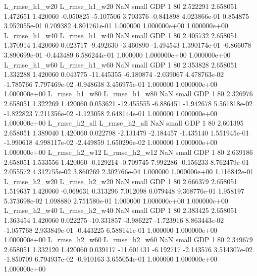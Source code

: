  L_rmse_h1_w20  L_rmse_h1_w20                   NaN      small      GDP                 1 80 2.522291       2.658051 1.472651       1.420060   -0.050825     -5.107506      3.703376    -0.841898   4.023866e-01  0.854875 3.952055e-01     0.709382   4.801761e-01            1.000000    1.000000e+00        1.000000e+00
 L_rmse_h1_w40  L_rmse_h1_w40                   NaN      small      GDP                 1 80 2.405732       2.658051 1.370914       1.420060    0.023717     -9.492630     -3.460890    -1.494543   1.390174e-01 -0.866078 3.890699e-01    -0.443489   6.586244e-01            1.000000    1.000000e+00        1.000000e+00
 L_rmse_h1_w60  L_rmse_h1_w60                   NaN      small      GDP                 1 80 2.353828       2.658051 1.332288       1.420060    0.043775    -11.445355     -6.180874    -2.039067   4.478763e-02 -1.785766 7.797469e-02    -0.948638   3.456975e-01            1.000000    1.000000e+00        1.000000e+00
 L_rmse_h1_w80  L_rmse_h1_w80                   NaN      small      GDP                 1 80 2.326976       2.658051 1.322269       1.420060    0.053621    -12.455555     -6.886451    -1.942678   5.561818e-02 -1.822823 7.211356e-02    -1.123058   2.648144e-01            1.000000    1.000000e+00        1.000000e+00
 L_rmse_h2_all  L_rmse_h2_all                   NaN      small      GDP                 1 80 2.601395       2.658051 1.389040       1.420060    0.022798     -2.131479     -2.184457    -1.435140   1.551945e-01 -1.990618 4.998117e-02    -2.449859   1.650296e-02            1.000000    1.000000e+00        1.000000e+00
 L_rmse_h2_w12  L_rmse_h2_w12                   NaN      small      GDP                 1 80 2.639186       2.658051 1.533556       1.420060   -0.129214     -0.709745      7.992286    -0.156233   8.762479e-01  2.055572 4.312755e-02     3.860269   2.302766e-04            1.000000    1.000000e+00        1.116842e-01
 L_rmse_h2_w20  L_rmse_h2_w20                   NaN      small      GDP                 1 80 2.666379       2.658051 1.519637       1.420060   -0.069631      0.313296      7.012098     0.079448   9.368776e-01  1.958197 5.373698e-02     1.098880   2.751580e-01            1.000000    1.000000e+00        1.000000e+00
 L_rmse_h2_w40  L_rmse_h2_w40                   NaN      small      GDP                 1 80 2.383425       2.658051 1.363454       1.420060    0.022275    -10.331857     -3.986227    -1.723916   8.863443e-02 -1.057768 2.933849e-01    -0.443225   6.588141e-01            1.000000    1.000000e+00        1.000000e+00
 L_rmse_h2_w60  L_rmse_h2_w60                   NaN      small      GDP                 1 80 2.349679       2.658051 1.332120       1.420060    0.039117    -11.601431     -6.192717    -2.143576   3.514307e-02 -1.850709 6.794937e-02    -0.910163   3.655054e-01            1.000000    1.000000e+00        1.000000e+00
